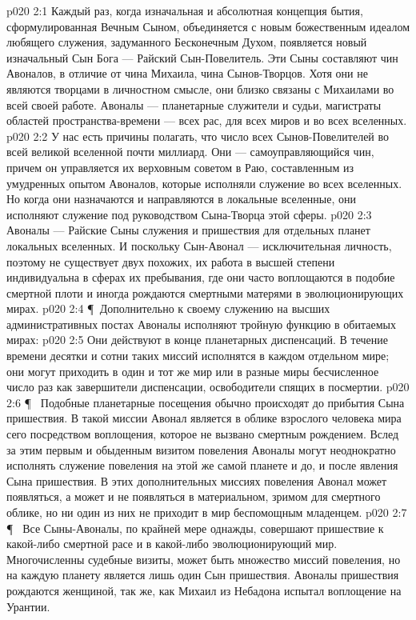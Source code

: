 \vs p020 2:1 Каждый раз, когда изначальная и абсолютная концепция бытия, сформулированная Вечным Сыном, объединяется с новым божественным идеалом любящего служения, задуманного Бесконечным Духом, появляется новый изначальный Сын Бога --- Райский Сын\hyp{}Повелитель. Эти Сыны составляют чин Авоналов, в отличие от чина Михаила, чина Сынов\hyp{}Творцов. Хотя они не являются творцами в личностном смысле, они близко связаны с Михаилами во всей своей работе. Авоналы --- планетарные служители и судьи, магистраты областей пространства\hyp{}времени --- всех рас, для всех миров и во всех вселенных.
\vs p020 2:2 У нас есть причины полагать, что число всех Сынов\hyp{}Повелителей во всей великой вселенной почти миллиард. Они --- самоуправляющийся чин, причем он управляется их верховным советом в Раю, составленным из умудренных опытом Авоналов, которые исполняли служение во всех вселенных. Но когда они назначаются и направляются в локальные вселенные, они исполняют служение под руководством Сына\hyp{}Творца этой сферы.
\vs p020 2:3 Авоналы --- Райские Сыны служения и пришествия для отдельных планет локальных вселенных. И поскольку Сын\hyp{}Авонал --- исключительная личность, поэтому не существует двух похожих, их работа в высшей степени индивидуальна в сферах их пребывания, где они часто воплощаются в подобие смертной плоти и иногда рождаются смертными матерями в эволюционирующих мирах.
\vs p020 2:4 \P\ Дополнительно к своему служению на высших административных постах Авоналы исполняют тройную функцию в обитаемых мирах:
\vs p020 2:5 \bibnobreakspace {} Они действуют в конце планетарных диспенсаций. В течение времени десятки и сотни таких миссий исполнятся в каждом отдельном мире; они могут приходить в один и тот же мир или в разные миры бесчисленное число раз как завершители диспенсации, освободители спящих в посмертии.
\vs p020 2:6 \P\ \bibnobreakspace {} Подобные планетарные посещения обычно происходят до прибытия Сына пришествия. В такой миссии Авонал является в облике взрослого человека мира сего посредством воплощения, которое не вызвано смертным рождением. Вслед за этим первым и обыденным визитом повеления Авоналы могут неоднократно исполнять служение повеления на этой же самой планете и до, и после явления Сына пришествия. В этих дополнительных миссиях повеления Авонал может появляться, а может и не появляться в материальном, зримом для смертного облике, но ни один из них не приходит в мир беспомощным младенцем.
\vs p020 2:7 \P\ \bibnobreakspace {} Все Сыны\hyp{}Авоналы, по крайней мере однажды, совершают пришествие к какой\hyp{}либо смертной расе и в какой\hyp{}либо эволюционирующий мир. Многочисленны судебные визиты, может быть множество миссий повеления, но на каждую планету является лишь один Сын пришествия. Авоналы пришествия рождаются женщиной, так же, как Михаил из Небадона испытал воплощение на Урантии.
